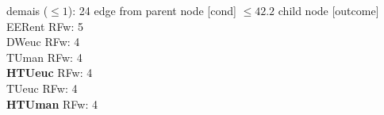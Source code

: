 {{{{%
demais ($\leq 1$): 24} edge from parent node [cond] {$\leq42.2$}}
child {node [outcome] {
EERent RFw: 5\\
DWeuc RFw: 4\\
TUman RFw: 4\\
\textbf{HTUeuc} RFw: 4\\
TUeuc RFw: 4\\
\textbf{HTUman} RFw: 4\\
}}}}
